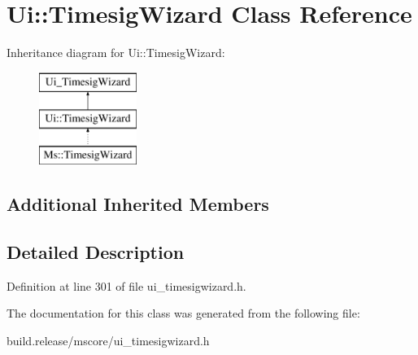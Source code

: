 \hypertarget{class_ui_1_1_timesig_wizard}{}\section{Ui\+:\+:Timesig\+Wizard Class Reference}
\label{class_ui_1_1_timesig_wizard}
Inheritance diagram for Ui\+:\+:Timesig\+Wizard\+:\begin{figure}[H]
\begin{center}
\leavevmode
\includegraphics[height=3.000000cm]{class_ui_1_1_timesig_wizard}
\end{center}
\end{figure}
\subsection*{Additional Inherited Members}


\subsection{Detailed Description}


Definition at line 301 of file ui\+\_\+timesigwizard.\+h.



The documentation for this class was generated from the following file\+:\begin{DoxyCompactItemize}
\item 
build.\+release/mscore/ui\+\_\+timesigwizard.\+h\end{DoxyCompactItemize}
